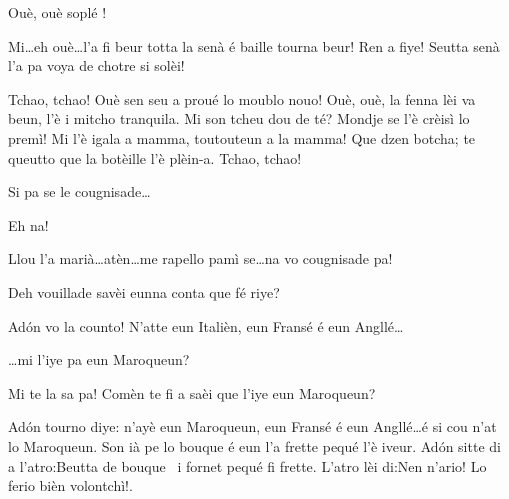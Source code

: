 \begin{drama}

\Valletspeaks{} Ouè, ouè soplé !


\Prosperospeaks Mi\ldots eh ouè\ldots l'a fi beur totta la senà é baille tourna beur! Ren a fiye! Seutta senà l'a pa voya de chotre si solèi!

\Prosperospeaks{} Tchao, tchao! Ouè sen seu a proué lo moublo nouo! Ouè, ouè, la fenna lèi va beun, l'è i mitcho tranquila. Mi son tcheu dou de té? Mondje se l'è crèisì lo premì! Mi l'è igala a mamma, toutouteun a la mamma! Que dzen botcha; te queutto que la botèille l'è plèin-a. Tchao, tchao!


\Prosperospeaks{} Si pa se le cougnisade\ldots

\Valletspeaks Eh na!

\Prosperospeaks Llou l'a marià\ldots atèn\ldots me rapello pamì se\ldots na  vo cougnisade pa!


\Prosperospeaks{} Deh vouillade savèi eunna conta que fé riye?


\Prosperospeaks Ad\'on vo la counto! N’atte eun Italièn, eun Fransé é eun Angllé\ldots 

\Vetchotspeaks \ldots mi l'iye pa eun Maroqueun?

\Prosperospeaks Mi te la sa pa! Comèn te fi a saèi que l'iye eun Maroqueun?


\Prosperospeaks{} Ad\'on tourno diye: n'ayè eun Maroqueun, eun Fransé é eun Angllé\ldots é si cou n'at lo Maroqueun. Son ià pe lo bouque é eun l'a frette pequé l'è iveur. Ad\'on sitte di a l'atro:\og Beutta de bouque \legna\ i fornet pequé fi frette\fg . L'atro lèi di:\og Nen n'ario! Lo ferio bièn volontchì!\fg .


\end{drama}
